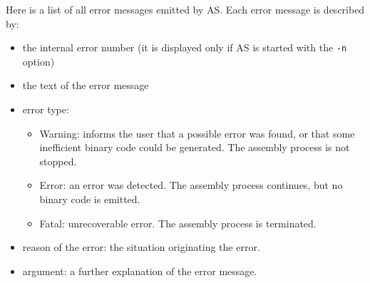 \documentclass[12pt,twoside]{report}
\newcommand{\tty}[1]{{\tt #1}}
\begin{document}
Here is a list of all error messages emitted by AS. Each error message is
described by:
\begin{itemize}
\item{the internal error number (it is displayed only if AS is started with the
      \tty{-n} option)}
\item{the text of the error message}
\item{error type:
      \begin{itemize}
      \item{Warning: informs the user that a possible error was
            found, or that some inefficient binary code
            could be generated. The assembly process is not
            stopped.}
      \item{Error: an error was detected. The assembly process
            continues, but no binary code is emitted.}
      \item{Fatal: unrecoverable error. The assembly process is
            terminated.}
      \end{itemize}}
\item{reason of the error: the situation originating the error.}
\item{argument:  a further explanation of the error message.}
\end{itemize}

\par

\newcommand{\errentry}[5]
           {\item[#1]{#2
                      \begin{description}
                      \item[Type:]{\ \\#3}
                      \item[Reason:]{\ \\#4}
                      \item[Argument:]{\ \\#5}
                      \end{description}}
           }
\end{document}

